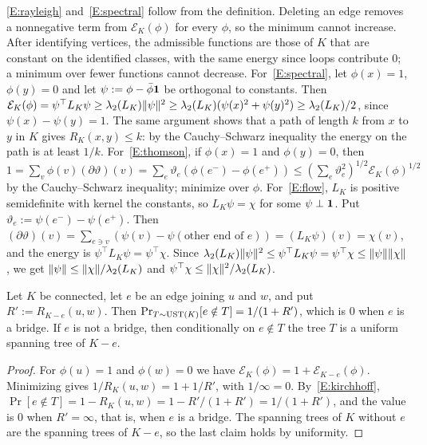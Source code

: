 \ref{E:rayleigh} and~\ref{E:spectral} follow from the definition. Deleting an edge removes a nonnegative term from $\mathcal E_K(\phi)$ for every $\phi$, so the minimum cannot increase. After identifying vertices, the admissible functions are those of $K$ that are constant on the identified classes, with the same energy since loops contribute $0$; a minimum over fewer functions cannot decrease. For~\ref{E:spectral}, let $\phi(x)=1$, $\phi(y)=0$ and let $\psi:=\phi-\bar\phi\mathbf{1}$ be orthogonal to constants. Then $\mathcal E_K(\phi)=\psi^{\top}L_K\psi\ge\lambda_2(L_K)\lVert \psi\rVert^2\ge\lambda_2(L_K)(\psi(x)^2+\psi(y)^2)\ge\lambda_2(L_K)/2$, since $\psi(x)-\psi(y)=1$. The same argument shows that a path of length $k$ from $x$ to $y$ in $K$ gives $R_K(x,y)\le k$: by the Cauchy--Schwarz inequality the energy on the path is at least $1/k$. For~\ref{E:thomson}, if $\phi(x)=1$ and $\phi(y)=0$, then $1=\sum_v\phi(v)(\partial\vartheta)(v)=\sum_e\vartheta_e(\phi(e^-)-\phi(e^+))\le(\sum_e\vartheta_e^2)^{1/2}\mathcal E_K(\phi)^{1/2}$ by the Cauchy--Schwarz inequality; minimize over $\phi$. For~\ref{E:flow}, $L_K$ is positive semidefinite with kernel the constants, so $L_K\psi=\chi$ for some $\psi\perp\mathbf{1}$. Put $\vartheta_e:=\psi(e^-)-\psi(e^+)$. Then $(\partial\vartheta)(v)=\sum_{e\ni v}(\psi(v)-\psi(\text{other end of }e))=(L_K\psi)(v)=\chi(v)$, and the energy is $\psi^{\top}L_K\psi=\psi^{\top}\chi$. Since $\lambda_2(L_K)\lVert \psi\rVert^2\le\psi^{\top}L_K\psi=\psi^{\top}\chi\le\lVert \psi\rVert\lVert \chi\rVert$, we get $\lVert \psi\rVert\le\lVert \chi\rVert/\lambda_2(L_K)$ and $\psi^{\top}\chi\le\lVert \chi\rVert^2/\lambda_2(L_K)$.

\begin{lemma}\label{lem:one-edge}
Let $K$ be connected, let $e$ be an edge joining $u$ and $w$, and put $R':=R_{K-e}(u,w)$. Then $\Pr_{T\sim\mathrm{UST}(K)}[e\notin T]=1/(1+R')$, which is $0$ when $e$ is a bridge. If $e$ is not a bridge, then conditionally on $e\notin T$ the tree $T$ is a uniform spanning tree of $K-e$.
\end{lemma}

\begin{proof}
For $\phi(u)=1$ and $\phi(w)=0$ we have $\mathcal E_K(\phi)=1+\mathcal E_{K-e}(\phi)$. Minimizing gives $1/R_K(u,w)=1+1/R'$, with $1/\infty=0$. By~\ref{E:kirchhoff}, $\Pr[e\notin T]=1-R_K(u,w)=1-R'/(1+R')=1/(1+R')$, and the value is $0$ when $R'=\infty$, that is, when $e$ is a bridge. The spanning trees of $K$ without $e$ are the spanning trees of $K-e$, so the last claim holds by uniformity.
\end{proof}

